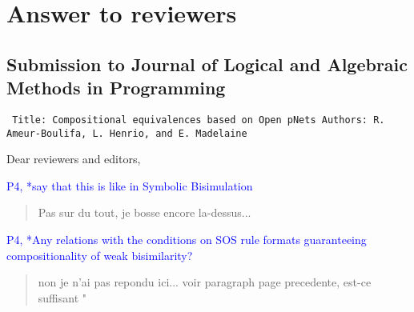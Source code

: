 \documentclass[10pt]{article}
\newenvironment{ttbox}{\begin{alltt}\small\tt}%
                      {\end{alltt}}
\newcommand{\ERIC}[1]{\textcolor{blue}{#1}}
\begin{document}
\section*{Answer to reviewers }
\subsection*{Submission to Journal of Logical and Algebraic Methods in Programming}
\medskip
\begin{ttbox}
Title: Compositional equivalences based on Open pNets
Authors: R. Ameur-Boulifa, L. Henrio, and E. Madelaine
\end{ttbox}
\bigskip
Dear reviewers and editors,



\ERIC{P4, *say that this is like in Symbolic Bisimulation
\begin{quote}Pas sur du tout, je bosse encore la-dessus...
\end{quote}}

\ERIC{P4, *Any relations with the conditions on SOS rule formats guaranteeing compositionality of weak bisimilarity?
\begin{quote} non je n'ai pas repondu ici... voir paragraph page precedente, est-ce suffisant "
\end{quote}}
\end{document}
